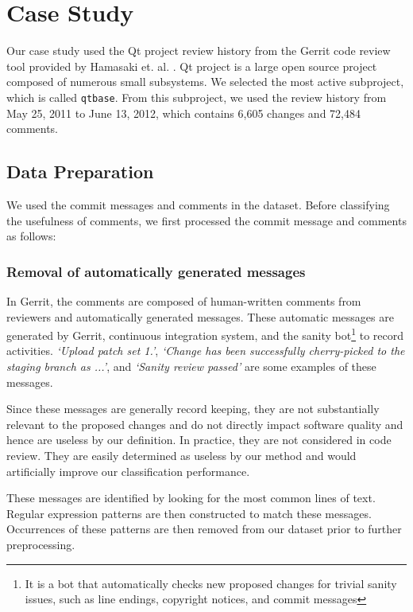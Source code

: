 
\section{Case Study}

Our case study used the Qt project review history from the Gerrit code review tool provided by Hamasaki et. al. \cite{Hamasaki2013}. Qt project is a large open source project composed of numerous small subsystems. We selected the most active subproject, which is called \texttt{qtbase}.
From this subproject, we used the review history from May 25, 2011 to June 13, 2012, which contains 6,605 changes and 72,484 comments.


\subsection{Data Preparation}
We used the commit messages and comments in the dataset.
Before classifying the usefulness of comments, we first processed the commit message and comments as follows: 

\subsubsection{Removal of automatically generated messages}
In Gerrit, the comments are composed of human-written comments from reviewers and automatically generated messages.
These automatic messages are generated by Gerrit, continuous integration system, and the sanity bot\footnote{It is a bot that automatically checks new proposed changes for trivial sanity issues, such as line endings, copyright notices, and commit messages} to record activities.
\textit{`Upload patch set 1.'}, \textit{`Change has been successfully cherry-picked to the staging branch as ...'}, and \textit{`Sanity review passed'} are some examples of these messages.

Since these messages are generally record keeping,
they are not substantially relevant to the proposed changes and do not directly impact software quality\cite{Mcintosh} and hence are useless by our definition.
In practice, they are not considered in code review.
They are easily determined as useless by our method and would artificially improve our classification performance.

These messages are identified by looking for the most common lines of text.
Regular expression patterns are then constructed to match these messages.
Occurrences of these patterns are then removed from our dataset prior to further preprocessing.

